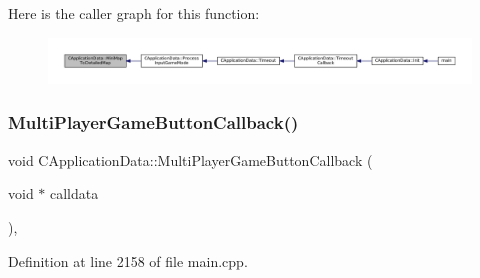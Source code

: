 Here is the caller graph for this function\+:
\nopagebreak
\begin{figure}[H]
\begin{center}
\leavevmode
\includegraphics[width=350pt]{classCApplicationData_a3dabde94ddec0eb2c732525f54164bc5_icgraph}
\end{center}
\end{figure}
\hypertarget{classCApplicationData_afabb120415cdadf67edca20c67e8c6fa}{}\label{classCApplicationData_afabb120415cdadf67edca20c67e8c6fa} 
\subsubsection{\texorpdfstring{Multi\+Player\+Game\+Button\+Callback()}{MultiPlayerGameButtonCallback()}}
{\footnotesize\ttfamily void C\+Application\+Data\+::\+Multi\+Player\+Game\+Button\+Callback (\begin{DoxyParamCaption}\item[{void $\ast$}]{calldata }\end{DoxyParamCaption})\hspace{0.3cm}{\ttfamily [static]}, {\ttfamily [protected]}}



Definition at line 2158 of file main.\+cpp.



